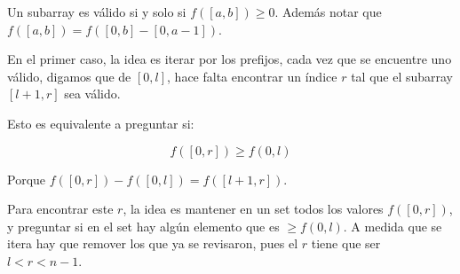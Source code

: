 \documentclass[14pt]{extarticle}
\begin{document}
Un subarray es válido si y solo si \( f([a, b]) \geq 0 \). Además notar que \( f([a, b]) = f([0, b] - [0, a-1]) \).

En el primer caso, la idea es iterar por los prefijos, cada vez que se encuentre uno válido, digamos que de \( [0, l] \), hace falta encontrar un índice \( r \) tal que el subarray \( [l+1, r] \) sea válido.

Esto es equivalente a preguntar si:

\[ f([0, r]) \geq f(0, l) \]

Porque \( f([0, r]) - f([0, l]) = f([l+1, r]) \).

Para encontrar este \( r \), la idea es mantener en un set todos los valores \( f([0, r]) \), y preguntar si en el set hay algún elemento que es \( \geq f(0, l) \). A medida que se itera hay que remover los que ya se revisaron, pues el \( r \) tiene que ser \( l < r < n-1 \).
\end{document}
